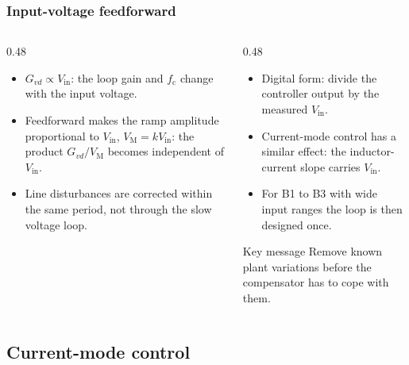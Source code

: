 \begin{frame}
	\frametitle{Input-voltage feedforward}
	\begin{columns}[T]
		\begin{column}{0.48\textwidth}
			\small
			\begin{itemize}
				\item $G_{vd}\propto V_\mathrm{in}$: the loop gain and $f_\mathrm{c}$ change with the input voltage.
				\item Feedforward makes the ramp amplitude proportional to $V_\mathrm{in}$, $V_\mathrm{M}=kV_\mathrm{in}$: the product $G_{vd}/V_\mathrm{M}$ becomes independent of $V_\mathrm{in}$.
				\item Line disturbances are corrected within the same period, not through the slow voltage loop.
			\end{itemize}
		\end{column}
		\begin{column}{0.48\textwidth}
			\small
			\begin{itemize}
				\item Digital form: divide the controller output by the measured $V_\mathrm{in}$.
				\item Current-mode control has a similar effect: the inductor-current slope carries $V_\mathrm{in}$.
				\item For B1 to B3 with wide input ranges the loop is then designed once.
			\end{itemize}
			\begin{block}{Key message}
				Remove known plant variations before the compensator has to cope with them.
			\end{block}
		\end{column}
	\end{columns}
\end{frame}

\subsection{Current-mode control}

